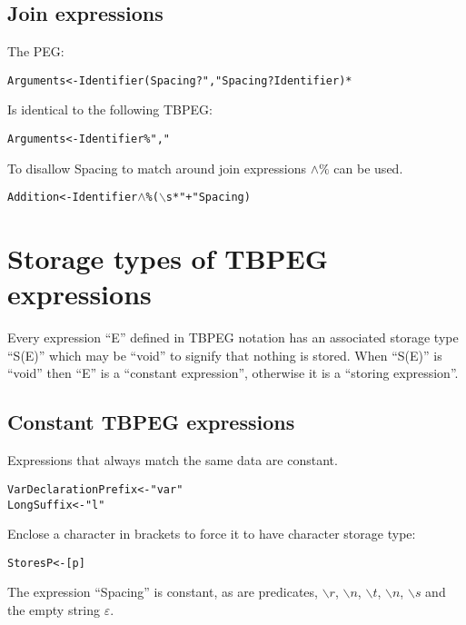 \documentclass[a4paper,11pt]{article}
\begin{document}
\subsection{Join expressions}
The PEG:
\begin{alltt}
    Arguments <- Identifier (Spacing? "," Spacing? Identifier)*
\end{alltt}

Is identical to the following TBPEG:
\begin{alltt}
    Arguments <- Identifier \% ","
\end{alltt}

To disallow Spacing to match around join expressions $\wedge \%$ can be used.
\begin{alltt}
    Addition <- Identifier \(\wedge\)\% (\(\backslash\)s* "+" Spacing)
\end{alltt}

\section{Storage types of TBPEG expressions}
Every expression ``E'' defined in TBPEG notation has an associated storage type ``S(E)'' which may be ``void'' to signify that nothing is stored.
When ``S(E)'' is ``void'' then ``E'' is a ``constant expression'', otherwise it is a ``storing expression''.

\subsection{Constant TBPEG expressions}
Expressions that always match the same data are constant.
\begin{alltt}
    VarDeclarationPrefix <- "var"
    LongSuffix           <- "l"
\end{alltt}

Enclose a character in brackets to force it to have character storage type:
\begin{alltt}
    StoresP <- [p]
\end{alltt}

The expression ``Spacing'' is constant, as are predicates, $\backslash r$, $\backslash n$, $\backslash t$, $\backslash n$, $\backslash s$ and the empty string $\varepsilon$.

\end{document}
